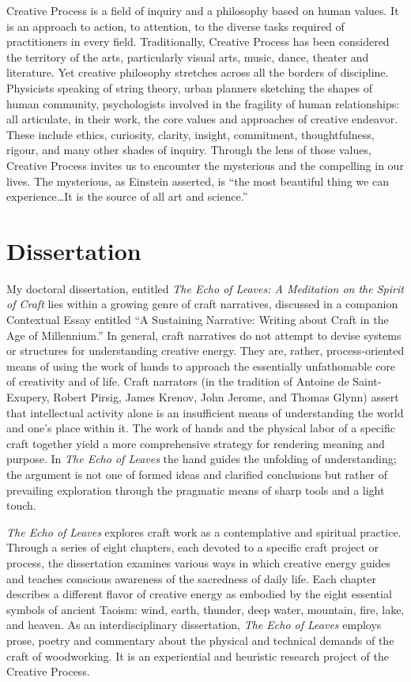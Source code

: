 \documentclass[10pt,DIV09,letterpaper,oneside,headsepline]{scrreprt}
\begin{document}
Creative Process is a field of inquiry and a philosophy based on human values. It is an approach to action, to attention, to the diverse tasks required of practitioners in every field. Traditionally, Creative Process has been considered the territory of the arts, particularly visual arts, music, dance, theater and literature. Yet creative philosophy stretches across all the borders of discipline. Physicists speaking of string theory, urban planners sketching the shapes of human community, psychologists involved in the fragility of human relationships: all articulate, in their work, the core values and approaches of creative endeavor. These include ethics, curiosity, clarity, insight, commitment, thoughtfulness, rigour, and many other shades of inquiry. Through the lens of those values, Creative Process invites us to encounter the mysterious and the compelling in our lives. The mysterious, as Einstein asserted, is ``the most beautiful thing we can experience\ldots It is the source of all art and science.''

\section{Dissertation}

My doctoral dissertation, entitled \textit{The Echo of Leaves: A Meditation on the Spirit of Craft} lies within a growing genre of craft narratives, discussed in a companion Contextual Essay entitled ``A Sustaining Narrative: Writing about Craft in the Age of Millennium.'' In general, craft narratives do not attempt to devise systems or structures for understanding creative energy. They are, rather, process-oriented means of using the work of hands to approach the essentially unfathomable core of creativity and of life. Craft narrators (in the tradition of Antoine de Saint-Exupery, Robert Pirsig, James Krenov, John Jerome, and Thomas Glynn) assert that intellectual activity alone is an insufficient means of understanding the world and one's place within it. The work of hands and the physical labor of a specific craft together yield a more comprehensive strategy for rendering meaning and purpose. In \textit{The Echo of Leaves} the hand guides the unfolding of understanding; the argument is not one of formed ideas and clarified conclusions but rather of prevailing exploration through the pragmatic means of sharp tools and a light touch.

\textit{The Echo of Leaves} explores craft work as a contemplative and spiritual practice. Through a series of eight chapters, each devoted to a specific craft project or process, the dissertation examines various ways in which creative energy guides and teaches conscious awareness of the sacredness of daily life. Each chapter describes a different flavor of creative energy as embodied by the eight essential symbols of ancient Taoism: wind, earth, thunder, deep water, mountain, fire, lake, and heaven. As an interdisciplinary dissertation, \textit{The Echo of Leaves} employs prose, poetry and commentary about the physical and technical demands of the craft of woodworking. It is an experiential and heuristic research project of the Creative Process.
\end{document}
